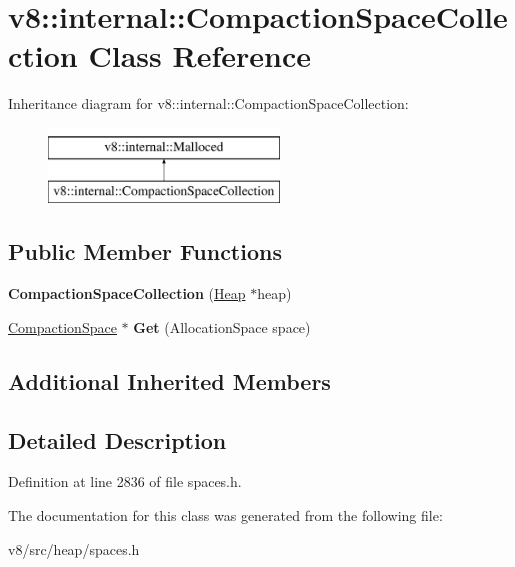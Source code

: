 \hypertarget{classv8_1_1internal_1_1CompactionSpaceCollection}{}\section{v8\+:\+:internal\+:\+:Compaction\+Space\+Collection Class Reference}
\label{classv8_1_1internal_1_1CompactionSpaceCollection}
Inheritance diagram for v8\+:\+:internal\+:\+:Compaction\+Space\+Collection\+:\begin{figure}[H]
\begin{center}
\leavevmode
\includegraphics[height=2.000000cm]{classv8_1_1internal_1_1CompactionSpaceCollection}
\end{center}
\end{figure}
\subsection*{Public Member Functions}
\begin{DoxyCompactItemize}
\item 
\mbox{\label{classv8_1_1internal_1_1CompactionSpaceCollection_a0795ec298478e81866cbf0d683de58f6}} 
{\bfseries Compaction\+Space\+Collection} (\mbox{\hyperlink{classv8_1_1internal_1_1Heap}{Heap}} $\ast$heap)
\item 
\mbox{\label{classv8_1_1internal_1_1CompactionSpaceCollection_aaf5fd50dbd0262a2686f1d3a0805dea5}} 
\mbox{\hyperlink{classv8_1_1internal_1_1CompactionSpace}{Compaction\+Space}} $\ast$ {\bfseries Get} (Allocation\+Space space)
\end{DoxyCompactItemize}
\subsection*{Additional Inherited Members}


\subsection{Detailed Description}


Definition at line 2836 of file spaces.\+h.



The documentation for this class was generated from the following file\+:\begin{DoxyCompactItemize}
\item 
v8/src/heap/spaces.\+h\end{DoxyCompactItemize}
